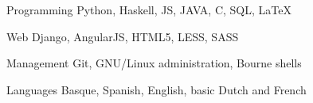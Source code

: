 

\begin{cvskills}

  \cvskill
    {Programming} %
    {Python, Haskell, JS, JAVA, C, SQL, LaTeX} %

  \cvskill
    {Web} %
    {Django, AngularJS, HTML5, LESS, SASS} %

  \cvskill
    {Management} %
    {Git, GNU/Linux administration, Bourne shells} %

  \cvskill
    {Languages} %
    {Basque, Spanish, English, basic Dutch and French} %

\end{cvskills}
